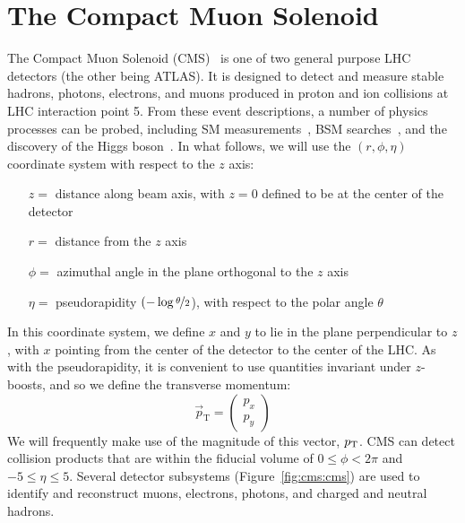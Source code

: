\section{The Compact Muon Solenoid}

The Compact Muon Solenoid (CMS)~\cite{cmsjinst} is one of two general purpose LHC detectors (the other being ATLAS).
It is designed to detect and measure stable hadrons, photons, electrons, and muons produced in proton and ion collisions at LHC interaction point 5. 
From these event descriptions, a number of physics processes can be probed, including SM measurements~\needcite, BSM searches~\needcite, and the discovery of the Higgs boson~\needcite. 
In what follows, we will use the $(r,\phi,\eta)$ coordinate system with respect to the $z$ axis:
\begin{itemize}
    \item[$z = $] distance along beam axis, with $z=0$ defined to be at the center of the detector
    \item[$r = $] distance from the $z$ axis
    \item[$\phi = $] azimuthal angle in the plane orthogonal to the $z$ axis
    \item[$\eta = $] pseudorapidity $(-\log\nicefrac{\theta}{2}$), with respect to the polar angle $\theta$ 
\end{itemize}
In this coordinate system, we define $x$ and $y$ to lie in the plane perpendicular to $z$, with $x$ pointing from the center of the detector to the center of the LHC.
As with the pseudorapidity, it is convenient to use quantities invariant under $z$-boosts, and so we define the transverse momentum:
\begin{equation}
    \vec{p}_\mathrm{T} = \left(\begin{matrix} p_x \\ p_y \end{matrix}\right)
\end{equation}
We will frequently make use of the magnitude of this vector, $p_\mathrm{T}$. 
CMS can detect collision products that are within the fiducial volume of $0 \leq \phi < 2\pi$ and $-5 \leq \eta\leq 5$. 
Several detector subsystems (Figure~\ref{fig:cms:cms}) are used to identify and reconstruct muons, electrons, photons, and charged and neutral hadrons. 

